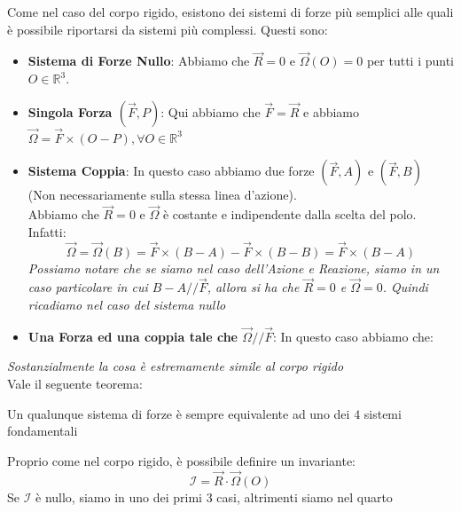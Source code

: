 \documentclass[11pt,a4paper,twoside]{article}
\theoremstyle{definition}
\begin{document}
Come nel caso del corpo rigido, esistono dei sistemi di forze più semplici alle quali è possibile riportarsi da sistemi più complessi. Questi sono:
\begin{itemize}
	\item \textbf{Sistema di Forze Nullo}: Abbiamo che $\vec R = 0$ e $\vec \Omega(O)=0$ per tutti i punti $O \in \mathbb R^3$.
	\item \textbf{Singola Forza $(\vec F, P)$}: Qui abbiamo che $\vec F = \vec R$ e abbiamo $\vec \Omega = \vec F \times (O-P), \forall O \in \mathbb R^3$
	\item \textbf{Sistema Coppia}: In questo caso abbiamo due forze $(\vec F, A)$ e $(\vec F, B)$ (Non necessariamente sulla stessa linea d'azione).\\
		Abbiamo che $\vec R = 0$ e $\vec \Omega$ è costante e indipendente dalla scelta del polo. Infatti:
		\[ \vec \Omega = \vec \Omega(B) = \vec F \times(B-A) - \vec F \times (B-B) = \vec F \times (B-A) \]
		\textit{Possiamo notare che se siamo nel caso dell'Azione e Reazione, siamo in un caso particolare in cui $B-A /\!/ \vec F$, allora si ha che $\vec R = 0$ e $\vec \Omega = 0$. Quindi ricadiamo nel caso del sistema nullo}
	\item \textbf{Una Forza ed una coppia tale che $\vec \Omega /\!/ \vec F$}: In questo caso abbiamo che:
		\begin{center}
		\end{center}
\end{itemize}

\textit{Sostanzialmente la cosa è estremamente simile al corpo rigido}\\
Vale il seguente teorema:

\begin{thm}{}{}
	Un qualunque sistema di forze è sempre equivalente ad uno dei $4$ sistemi fondamentali
\end{thm}

Proprio come nel corpo rigido, è possibile definire un invariante:
\[ \mathcal I = \vec R \cdot \vec \Omega(O) \]
Se $\mathcal I$ è nullo, siamo in uno dei primi 3 casi, altrimenti siamo nel quarto
\end{document}
